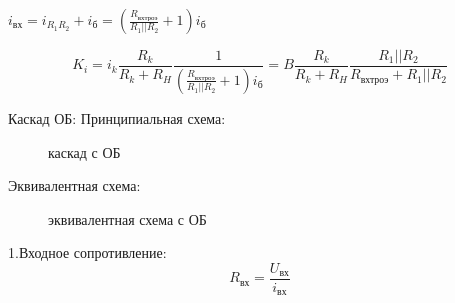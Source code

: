 \documentclass[12pt,a4paper]{article}
\begin{document}
$i_\textit{вх}=i_{R_1R_2}+i_\textit{б}=\left(\frac{R_\textit{вхтроэ}}{R_1||R_2}+1\right)i_\textit{б}$

$$K_i=i_k\frac{R_k}{R_k+R_H}\frac{1}{\left(\frac{R_\textit{вхтроэ}}{R_1||R_2}+1\right)i_\textit{б}}=B\frac{R_k}{R_k+R_H}\frac{R_1||R_2}{R_\textit{вхтроэ}+R_1||R_2}
$$


Каскад ОБ:
Принципиальная схема:
\begin{center}
	\begin{figure}[h!]
		\caption{каскад с ОБ}	
		\label{OB}
	\end{figure}
\end{center}
Эквивалентная схема:
\begin{center}
	\begin{figure}[h!]
		\caption{эквивалентная схема с ОБ}	
		\label{EOB}
	\end{figure}
\end{center}

1.Входное сопротивление:
$$R_\textit{вх}=\frac{U_\textit{вх}}{i_\textit{вх}}$$
\end{document}
